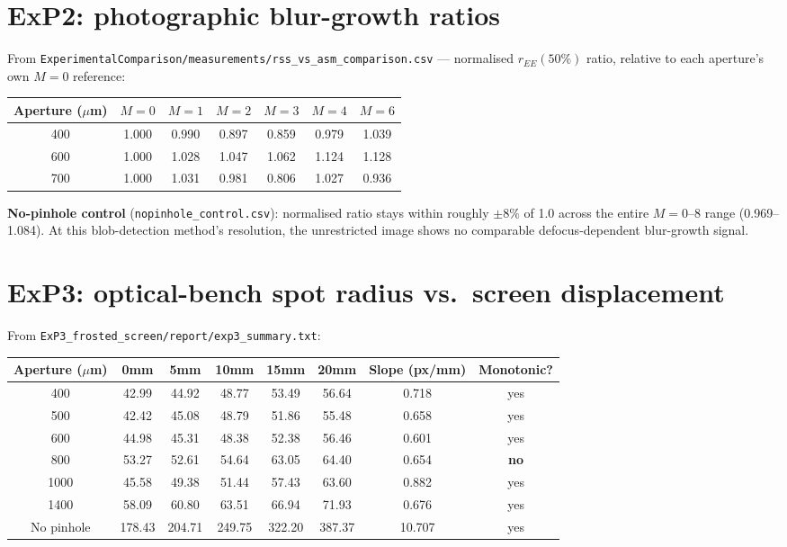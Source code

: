 \documentclass[11pt]{report}
\begin{document}
\section{ExP2: photographic blur-growth ratios}

From \texttt{ExperimentalComparison/measurements/rss\_vs\_asm\_comparison.csv} ---
normalised $r_{EE}(50\%)$ ratio, relative to each aperture's own $M=0$ reference:

\begin{center}
\begin{tabular}{ccccccc}
\toprule
Aperture ($\mu$m) & $M=0$ & $M=1$ & $M=2$ & $M=3$ & $M=4$ & $M=6$ \\
\midrule
400 & 1.000 & 0.990 & 0.897 & 0.859 & 0.979 & 1.039 \\
600 & 1.000 & 1.028 & 1.047 & 1.062 & 1.124 & 1.128 \\
700 & 1.000 & 1.031 & 0.981 & 0.806 & 1.027 & 0.936 \\
\bottomrule
\end{tabular}
\end{center}

\textbf{No-pinhole control} (\texttt{nopinhole\_control.csv}): normalised ratio stays
within roughly $\pm8\%$ of 1.0 across the entire $M=0$--8 range (0.969--1.084). At this
blob-detection method's resolution, the unrestricted image shows no comparable
defocus-dependent blur-growth signal.

\section{ExP3: optical-bench spot radius vs.\ screen displacement}

From \texttt{ExP3\_frosted\_screen/report/exp3\_summary.txt}:

\begin{center}
\begin{tabular}{cccccccc}
\toprule
Aperture ($\mu$m) & 0mm & 5mm & 10mm & 15mm & 20mm & Slope (px/mm) & Monotonic? \\
\midrule
400 & 42.99 & 44.92 & 48.77 & 53.49 & 56.64 & 0.718 & yes \\
500 & 42.42 & 45.08 & 48.79 & 51.86 & 55.48 & 0.658 & yes \\
600 & 44.98 & 45.31 & 48.38 & 52.38 & 56.46 & 0.601 & yes \\
800 & 53.27 & 52.61 & 54.64 & 63.05 & 64.40 & 0.654 & \textbf{no} \\
1000 & 45.58 & 49.38 & 51.44 & 57.43 & 63.60 & 0.882 & yes \\
1400 & 58.09 & 60.80 & 63.51 & 66.94 & 71.93 & 0.676 & yes \\
\midrule
No pinhole & 178.43 & 204.71 & 249.75 & 322.20 & 387.37 & 10.707 & yes \\
\bottomrule
\end{tabular}
\end{center}
\end{document}
